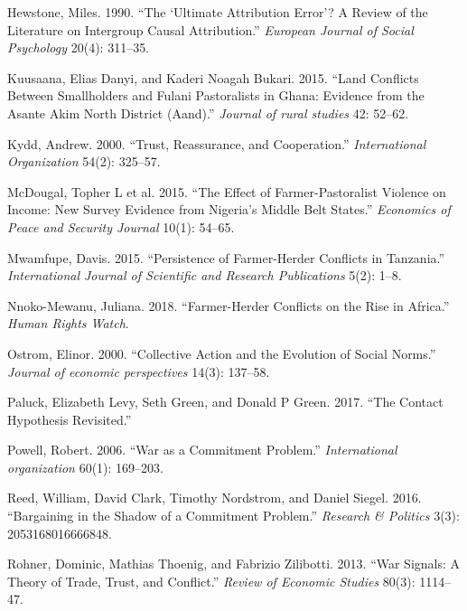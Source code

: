 \documentclass[11pt]{article}
\begin{document}
\leavevmode\hypertarget{ref-hewstone1990ultimate}{}%
Hewstone, Miles. 1990. ``The `Ultimate Attribution Error'? A Review of
the Literature on Intergroup Causal Attribution.'' \emph{European
Journal of Social Psychology} 20(4): 311--35.

\leavevmode\hypertarget{ref-kuusaana2015land}{}%
Kuusaana, Elias Danyi, and Kaderi Noagah Bukari. 2015. ``Land Conflicts
Between Smallholders and Fulani Pastoralists in Ghana: Evidence from the
Asante Akim North District (Aand).'' \emph{Journal of rural studies} 42:
52--62.

\leavevmode\hypertarget{ref-kydd2000trust}{}%
Kydd, Andrew. 2000. ``Trust, Reassurance, and Cooperation.''
\emph{International Organization} 54(2): 325--57.

\leavevmode\hypertarget{ref-mcdougal2015effect}{}%
McDougal, Topher L et al. 2015. ``The Effect of Farmer-Pastoralist
Violence on Income: New Survey Evidence from Nigeria's Middle Belt
States.'' \emph{Economics of Peace and Security Journal} 10(1): 54--65.

\leavevmode\hypertarget{ref-mwamfupe2015persistence}{}%
Mwamfupe, Davis. 2015. ``Persistence of Farmer-Herder Conflicts in
Tanzania.'' \emph{International Journal of Scientific and Research
Publications} 5(2): 1--8.

\leavevmode\hypertarget{ref-hrc2018farmer}{}%
Nnoko-Mewanu, Juliana. 2018. ``Farmer-Herder Conflicts on the Rise in
Africa.'' \emph{Human Rights Watch}.

\leavevmode\hypertarget{ref-ostrom2000collective}{}%
Ostrom, Elinor. 2000. ``Collective Action and the Evolution of Social
Norms.'' \emph{Journal of economic perspectives} 14(3): 137--58.

\leavevmode\hypertarget{ref-paluck2017contact}{}%
Paluck, Elizabeth Levy, Seth Green, and Donald P Green. 2017. ``The
Contact Hypothesis Revisited.''

\leavevmode\hypertarget{ref-powell2006war}{}%
Powell, Robert. 2006. ``War as a Commitment Problem.''
\emph{International organization} 60(1): 169--203.

\leavevmode\hypertarget{ref-reed2016bargaining}{}%
Reed, William, David Clark, Timothy Nordstrom, and Daniel Siegel. 2016.
``Bargaining in the Shadow of a Commitment Problem.'' \emph{Research \&
Politics} 3(3): 2053168016666848.

\leavevmode\hypertarget{ref-rohner2013war}{}%
Rohner, Dominic, Mathias Thoenig, and Fabrizio Zilibotti. 2013. ``War
Signals: A Theory of Trade, Trust, and Conflict.'' \emph{Review of
Economic Studies} 80(3): 1114--47.
\end{document}
